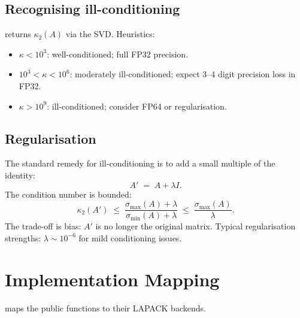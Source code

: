 \subsection{Recognising ill-conditioning}
\label{ssec:linalg:ill_cond}

 returns $\kappa_2(A)$ via the SVD. Heuristics:
\begin{itemize}
  \item $\kappa < 10^3$: well-conditioned; full FP32 precision.
  \item $10^3 < \kappa < 10^6$: moderately ill-conditioned; expect
    3--4 digit precision loss in FP32.
  \item $\kappa > 10^9$: ill-conditioned; consider FP64 or
    regularisation.
\end{itemize}

\subsection{Regularisation}
\label{ssec:linalg:regularisation}

The standard remedy for ill-conditioning is to add a small
multiple of the identity:
\[
A' \;=\; A + \lambda I.
\]
The condition number is bounded:
\[
\kappa_2(A') \;\leq\; \frac{\sigma_{\max}(A) + \lambda}{\sigma_{\min}(A) + \lambda}
\;\leq\; \frac{\sigma_{\max}(A)}{\lambda}.
\]
The trade-off is bias: $A'$ is no longer the original matrix.
Typical regularisation strengths: $\lambda \sim 10^{-6}$ for
mild conditioning issues.

\section{Implementation Mapping}
\label{sec:linalg:impl_mapping}

 maps the public functions to
their LAPACK backends.

